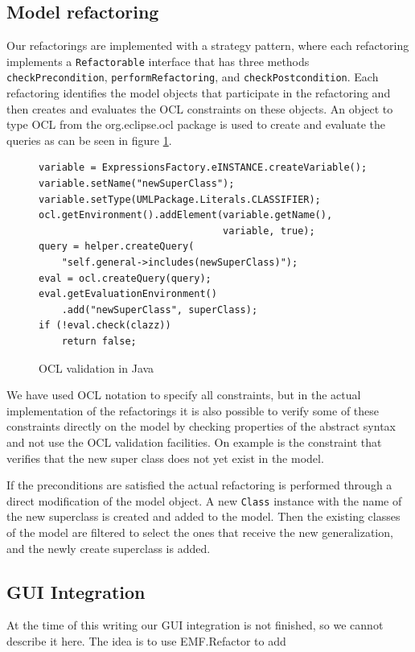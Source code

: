 \documentclass{llncs}
\begin{document}
\subsection{Model refactoring}
Our refactorings are implemented with a strategy pattern, where each refactoring implements a \lstinline|Refactorable|
interface that has three methods \lstinline|checkPrecondition|, \lstinline|performRefactoring|, and \lstinline|checkPostcondition|. Each refactoring identifies the model objects that participate in the refactoring and then creates
and evaluates the OCL constraints on these objects. An object to type OCL from the org.eclipse.ocl package is used to create and evaluate the queries as can be seen in figure \ref{lst:ocl}.

\begin{figure}
\begin{lstlisting}
variable = ExpressionsFactory.eINSTANCE.createVariable();
variable.setName("newSuperClass");
variable.setType(UMLPackage.Literals.CLASSIFIER);
ocl.getEnvironment().addElement(variable.getName(),
                                variable, true);
query = helper.createQuery(
    "self.general->includes(newSuperClass)");
eval = ocl.createQuery(query);
eval.getEvaluationEnvironment()
    .add("newSuperClass", superClass);
if (!eval.check(clazz))
    return false;
\end{lstlisting}
\caption{OCL validation in Java}
\label{lst:ocl}
\end{figure}

We have used OCL notation to specify all constraints, but in the actual implementation of the refactorings it
is also possible to verify some of these constraints directly on the model by checking properties of the abstract syntax
and not use the OCL validation facilities. On example is the constraint that verifies that the new super class does not
yet exist in the model.

If the preconditions are satisfied the actual refactoring is performed through a direct modification of the model object.
A new \lstinline|Class| instance with the name of the new superclass is created and added to the model. Then the existing
classes of the model are filtered to select the ones that receive the new generalization, and the newly create superclass
is added.




\subsection{GUI Integration}
At the time of this writing our GUI integration is not finished, so we cannot describe it here. The idea is to use EMF.Refactor to add 
\end{document}
